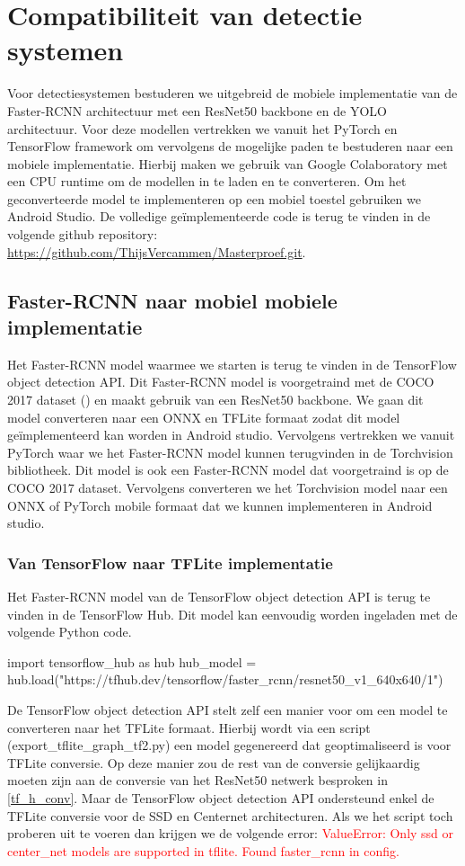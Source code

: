 \chapter{Compatibiliteit van detectie systemen}
Voor detectiesystemen bestuderen we uitgebreid de mobiele implementatie van de Faster-RCNN architectuur met een ResNet50 backbone en de YOLO architectuur.
Voor deze modellen vertrekken we vanuit het PyTorch en TensorFlow framework om vervolgens de mogelijke paden te bestuderen naar een mobiele implementatie.
Hierbij maken we gebruik van Google Colaboratory met een CPU runtime om de modellen in te laden en te converteren.
Om het geconverteerde model te implementeren op een mobiel toestel gebruiken we Android Studio.
De volledige ge\"implementeerde code is terug te vinden in de volgende github repository: \url{https://github.com/ThijsVercammen/Masterproef.git}.

\section{Faster-RCNN naar mobiel mobiele implementatie}
Het Faster-RCNN model waarmee we starten is terug te vinden in de TensorFlow object detection API.
Dit Faster-RCNN model is voorgetraind met de COCO 2017 dataset (\cite{lin2015microsoft}) en maakt gebruik van een ResNet50 backbone.
We gaan dit model converteren naar een ONNX en TFLite formaat zodat dit model ge\"implementeerd kan worden in Android studio.
Vervolgens vertrekken we vanuit PyTorch waar we het Faster-RCNN model kunnen terugvinden in de Torchvision bibliotheek.
Dit model is ook een Faster-RCNN model dat voorgetraind is op de COCO 2017 dataset.
Vervolgens converteren we het Torchvision model naar een ONNX of PyTorch mobile formaat dat we kunnen implementeren in Android studio.

\subsection{Van TensorFlow naar TFLite implementatie} \label{rcnn_tf}
Het Faster-RCNN model van de TensorFlow object detection API is terug te vinden in de TensorFlow Hub.
Dit model kan eenvoudig worden ingeladen met de volgende Python code.

\begin{python}
import tensorflow_hub as hub
hub_model = hub.load("https://tfhub.dev/tensorflow/faster_rcnn/resnet50_v1_640x640/1")
\end{python}

De TensorFlow object detection API stelt zelf een manier voor om een model te converteren naar het TFLite formaat.
Hierbij wordt via een script (export\_tflite\_graph\_tf2.py) een model gegenereerd dat geoptimaliseerd is voor TFLite conversie.
Op deze manier zou de rest van de conversie gelijkaardig moeten zijn aan de conversie van het ResNet50 netwerk besproken in \ref{tf_h_conv}.
Maar de TensorFlow object detection API ondersteund enkel de TFLite conversie voor de SSD en Centernet architecturen.
Als we het script toch proberen uit te voeren dan krijgen we de volgende error: 
\textcolor{red}{ValueError: Only ssd or center\_net models are supported in tflite. Found faster\_rcnn in config.}


